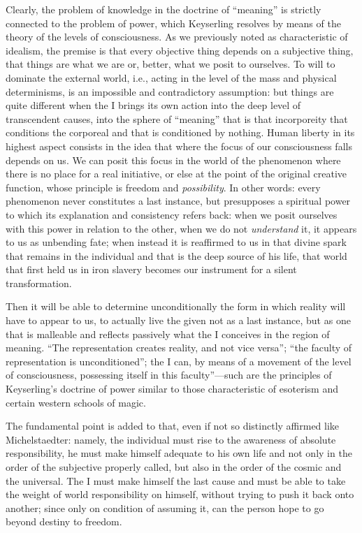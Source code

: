 Clearly, the problem of knowledge in the doctrine of ``meaning'' is strictly connected to the problem of power, which Keyserling resolves by means of the theory of the levels of consciousness. As we previously noted as characteristic of idealism, the premise is that every objective thing depends on a subjective thing, that things are what we are or, better, what we posit to ourselves. To will to dominate the external world, i.e., acting in the level of the mass and physical determinisms, is an impossible and contradictory assumption: but things are quite different when the I brings its own action into the deep level of transcendent causes, into the sphere of ``meaning'' that is that incorporeity that conditions the corporeal and that is conditioned by nothing. Human liberty in its highest aspect consists in the idea that where the focus of our consciousness falls depends on us. We can posit this focus in the world of the phenomenon where there is no place for a real initiative, or else at the point of the original creative function, whose principle is freedom and \emph{possibility}. In other words: every phenomenon never constitutes a last instance, but presupposes a spiritual power to which its explanation and consistency refers back: when we posit ourselves with this power in relation to the other, when we do not \emph{understand} it, it appears to us as unbending fate; when instead it is reaffirmed to us in that divine spark that remains in the individual and that is the deep source of his life, that world that first held us in iron slavery becomes our instrument for a silent transformation.

Then it will be able to determine unconditionally the form in which reality will have to appear to us, to actually live the given not as a last instance, but as one that is malleable and reflects passively what the I conceives in the region of meaning. ``The representation creates reality, and not vice versa''; ``the faculty of representation is unconditioned''; the I can, by means of a movement of the level of consciousness, possessing itself in this faculty''---such are the principles of Keyserling's doctrine of power similar to those characteristic of esoterism and certain western schools of magic.

The fundamental point is added to that, even if not so distinctly affirmed like Michelstaedter: namely, the individual must rise to the awareness of absolute responsibility, he must make himself adequate to his own life and not only in the order of the subjective properly called, but also in the order of the cosmic and the universal. The I must make himself the last cause and must be able to take the weight of world responsibility on himself, without trying to push it back onto another; since only on condition of assuming it, can the person hope to go beyond destiny to freedom.

